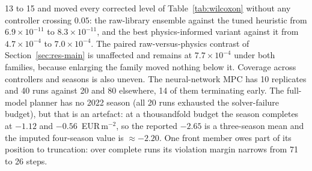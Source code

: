 13 to 15 and moved every corrected level of Table~\ref{tab:wilcoxon} without any
controller crossing $0.05$: the raw-library ensemble against the tuned heuristic from
$6.9\times10^{-11}$ to $8.3\times10^{-11}$, and the best physics-informed variant against
it from $4.7\times10^{-4}$ to $7.0\times10^{-4}$. The paired raw-versus-physics contrast
of Section~\ref{sec:res-main} is unaffected and remains at $7.7\times10^{-4}$ under both
families, because enlarging the family moved nothing below it. Coverage across controllers
and seasons is also uneven. The neural-network MPC has 10 replicates and 40 runs against
20 and 80 elsewhere, 14 of them terminating early. The full-model planner has no 2022 season (all 20
runs exhausted the solver-failure budget), but that is an artefact: at a thousandfold
budget the season completes at $-1.12$ and $-0.56$~EUR\,m$^{-2}$, so the reported $-2.65$
is a three-season mean and the imputed four-season value is $\approx-2.20$. One front
member owes part of its position to truncation: over complete runs its violation margin
narrows from 71 to 26 steps.

